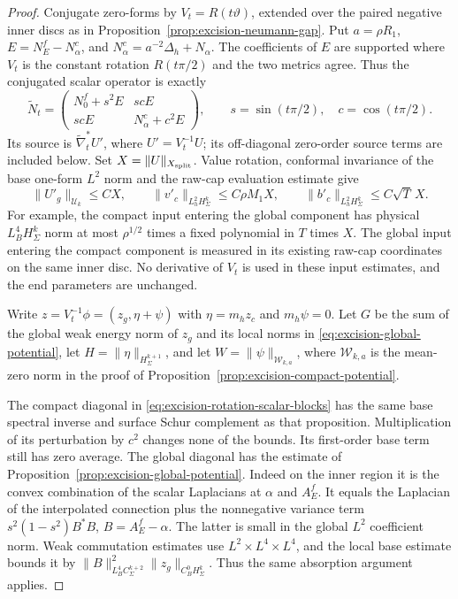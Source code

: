 \documentclass[11pt]{amsart}
\theoremstyle{definition}
\theoremstyle{remark}
\theoremstyle{plain}
\begin{document}
\begin{proof}
Conjugate zero-forms by $V_t=R(t\vartheta)$, extended over
the paired negative inner discs as in
Proposition~\ref{prop:excision-neumann-gap}.
Put $a=\rho R_1$, $E=N_E^f-N_\alpha^c$, and
$N_\alpha^c=a^{-2}\Delta_h+N_\alpha$.
The coefficients of $E$ are supported where $V_t$ is
the constant rotation $R(t\pi/2)$ and the two metrics
agree. Thus the conjugated scalar operator is exactly
\begin{equation}\label{eq:excision-rotation-scalar-blocks}
 \widetilde N_t=
 \begin{pmatrix}
    N_0^f+s^2E&scE\\
    scE&N_\alpha^c+c^2E
 \end{pmatrix},
 \qquad s=\sin(t\pi/2),\quad c=\cos(t\pi/2).
\end{equation}
Its source is $\widetilde\nabla_t^*U'$,
where $U'=V_t^{-1}U$; its off-diagonal zero-order
source terms are included below. Set $X=\|U\|_{X_{\rm split}}$.
Value rotation, conformal invariance of the base
one-form $L^2$ norm and the raw-cap evaluation estimate give
\[
 \|U'_g\|_{\mathcal U_k}\leq CX,\qquad
 \|v'_c\|_{L^2_hH^k_\Sigma}\leq C\rho M_1X,\qquad
 \|b'_c\|_{L^2_hH^k_\Sigma}\leq C\sqrt T\,X .
\]
For example, the compact input entering the global
component has physical $L^4_BH^k_\Sigma$ norm at most
$\rho^{1/2}$ times a fixed polynomial in $T$ times $X$.
The global input entering the compact component is
measured in its existing raw-cap coordinates on the
same inner disc. No derivative of $V_t$ is used in
these input estimates, and the end parameters are unchanged.

Write $z=V_t^{-1}\phi=(z_g,\eta+\psi)$ with
$\eta=m_hz_c$ and $m_h\psi=0$.
Let $G$ be the sum of the global weak energy norm of
$z_g$ and its local norms in
\eqref{eq:excision-global-potential}, let
$H=\|\eta\|_{H^{k+1}_\Sigma}$, and let
$W=\|\psi\|_{\mathcal W_{k,a}}$, where
$\mathcal W_{k,a}$ is the mean-zero norm in the proof of
Proposition~\ref{prop:excision-compact-potential}.

The compact diagonal in
\eqref{eq:excision-rotation-scalar-blocks} has the same
base spectral inverse and surface Schur complement as
that proposition. Multiplication of its perturbation by
$c^2$ changes none of the bounds.
Its first-order base term still has zero average.
The global diagonal has the estimate of
Proposition~\ref{prop:excision-global-potential}.
Indeed on the inner region it is the convex combination
of the scalar Laplacians at $\alpha$ and $A_E^f$.
It equals the Laplacian of the interpolated connection
plus the nonnegative variance term
$s^2(1-s^2)B^*B$, $B=A_E^f-\alpha$.
The latter is small in the global $L^2$ coefficient norm.
Weak commutation estimates use $L^2\times L^4\times L^4$,
and the local base estimate bounds it by
$\|B\|_{L^4_BC^{k+2}_\Sigma}^2
 \|z_g\|_{C^0_BH^k_\Sigma}$.
Thus the same absorption argument applies.


\end{proof}
\end{document}

